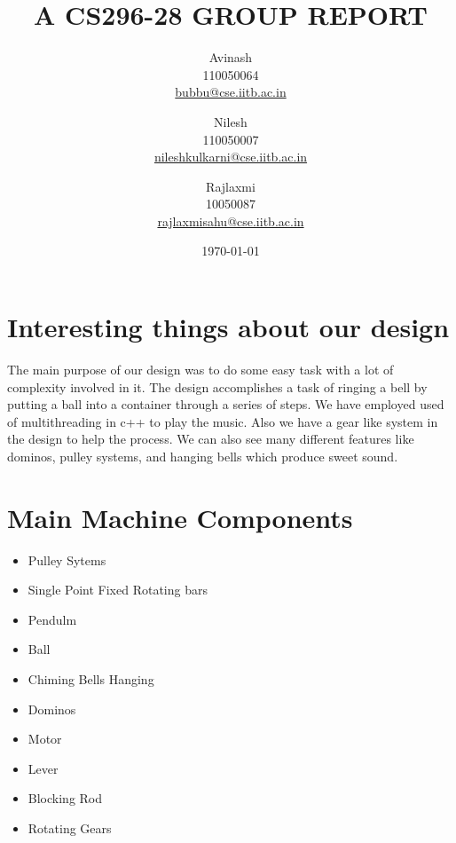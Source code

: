 \documentclass[a4paper,11pt]{article}
\begin{document}
\title{ A CS296-28 GROUP REPORT }
\author{
	Avinash\\
	110050064\\
	\href{mailto:bubbu@cse.iitb.ac.in}{bubbu@cse.iitb.ac.in}\\
	\and 
	Nilesh\\
	110050007\\
	\href{mailto:nileshkulkarni@cse.iitb.ac.in}{nileshkulkarni@cse.iitb.ac.in}\\
	\and
	Rajlaxmi\\
	10050087\\
	\href{mailto:rajlaxmisahu@cse.iitb.ac.in}{rajlaxmisahu@cse.iitb.ac.in}\\
	}
\date{\today}
\maketitle
{}
\tableofcontents	
\newpage
{}

\section{Interesting things about our design}
The main purpose of our design was to do some easy task with a lot of complexity involved in it. The design accomplishes a task of ringing a bell by putting a ball into a container through a series of steps. We have employed used of multithreading in c++ to play the music. Also we have a gear like system in the design to help the process. We can also see many different features like dominos, pulley systems, and hanging bells which produce sweet sound.
\section{Main Machine Components}
	\begin{itemize}
		\item Pulley Sytems
		\item Single Point Fixed Rotating bars
		\item Pendulm
		\item Ball
		\item Chiming Bells Hanging
		\item Dominos
		\item Motor
		\item Lever
		\item Blocking Rod
		\item Rotating Gears
	\end{itemize}
 	
\end{document}

